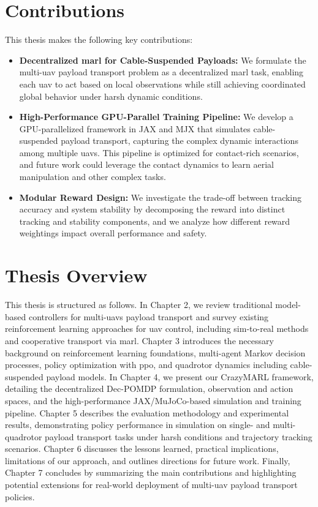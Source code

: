 \section{Contributions}
This thesis makes the following key contributions:
\begin{itemize}
    \item \textbf{Decentralized \gls{marl} for Cable-Suspended Payloads:} We formulate the multi-\gls{uav} payload transport problem as a decentralized \gls{marl} task, enabling each \gls{uav} to act based on local observations while still achieving coordinated global behavior under harsh dynamic conditions.
    \item \textbf{High-Performance GPU-Parallel Training Pipeline:} We develop a GPU-parallelized framework in JAX and MJX that simulates cable-suspended payload transport, capturing the complex dynamic interactions among multiple \glspl{uav}. This pipeline is optimized for contact-rich scenarios, and future work could leverage the contact dynamics to learn aerial manipulation and other complex tasks.
    \item \textbf{Modular Reward Design:} We investigate the trade-off between tracking accuracy and system stability by decomposing the reward into distinct tracking and stability components, and we analyze how different reward weightings impact overall performance and safety.
\end{itemize}

\section{Thesis Overview}
This thesis is structured as follows. In Chapter 2, we review traditional model-based controllers for multi-\glspl{uav} payload transport and survey existing reinforcement learning approaches for \gls{uav} control, including sim-to-real methods and cooperative transport via \gls{marl}. Chapter 3 introduces the necessary background on reinforcement learning foundations, multi-agent Markov decision processes, policy optimization with \gls{ppo}, and quadrotor dynamics including cable-suspended payload models. In Chapter 4, we present our CrazyMARL framework, detailing the decentralized Dec-POMDP formulation, observation and action spaces, and the high-performance JAX/MuJoCo-based simulation and training pipeline. Chapter 5 describes the evaluation methodology and experimental results, demonstrating policy performance in simulation on single- and multi-quadrotor payload transport tasks under harsh conditions and trajectory tracking scenarios. Chapter 6 discusses the lessons learned, practical implications, limitations of our approach, and outlines directions for future work. Finally, Chapter 7 concludes by summarizing the main contributions and highlighting potential extensions for real-world deployment of multi-\gls{uav} payload transport policies.